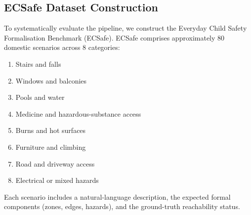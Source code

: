 \subsection{ECSafe Dataset Construction}
To systematically evaluate the pipeline, we construct the Everyday Child Safety Formalisation Benchmark (ECSafe). ECSafe comprises approximately 80 domestic scenarios across 8 categories:
\begin{enumerate}
    \item Stairs and falls
    \item Windows and balconies
    \item Pools and water
    \item Medicine and hazardous-substance access
    \item Burns and hot surfaces
    \item Furniture and climbing
    \item Road and driveway access
    \item Electrical or mixed hazards
\end{enumerate}

Each scenario includes a natural-language description, the expected formal components (zones, edges, hazards), and the ground-truth reachability status.
